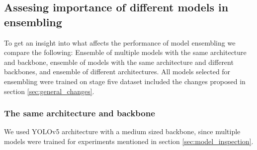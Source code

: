 \subsection{Assesing importance of different models in ensembling}
To get an insight into what affects the performance of model ensembling we compare the following: Ensemble of multiple models with the same architecture and backbone, ensemble of models with the same architecture and different backbones, and ensemble of different architectures. All models selected for ensembling were trained on stage five dataset included the changes proposed in section \ref{sec:general_changes}.


\subsubsection{The same architecture and backbone}
We used YOLOv5 architecture with a medium sized backbone, since multiple models were trained for experiments mentioned in section \ref{sec:model_inspection}.
